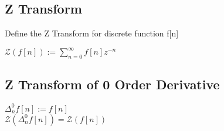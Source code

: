 \documentclass[11pt]{article}
\begin{document}
\subsection{Z Transform}
Define the Z Transform for discrete function f[n]
\begin{center}
$
\mathcal{Z}(f[n]) := \sum_{n=0}^{\infty}f[n]z^{-n}
$
\end{center}


\subsection{Z Transform of 0 Order Derivative}
\begin{center}
\vspace{1mm}
$
\Delta_n^0 f[n] := f[n]
$
\\ \vspace{3mm}
$
\mathcal{Z}(\Delta_n^0 f[n]) = \mathcal{Z}(f[n])
$
\end{center}
\end{document}
